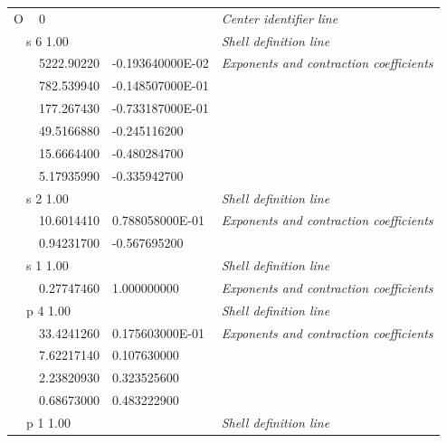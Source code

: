 \documentclass[a4paper,12pt]{article}
\begin{document}
\begin{tabular}{lllll}
\multicolumn{2}{l}{O} & \multicolumn{2}{l}{0} & {\em Center identifier line} \\
 & \multicolumn{3}{l}{s \hspace{0.5 cm}  6  \hspace{0.5 cm} 1.00}  & {\em Shell definition line} \\
 &   & 5222.90220 &  -0.193640000E-02  & {\em Exponents and contraction coefficients} \\
 &   & 782.539940 &  -0.148507000E-01  &          \\
 &   & 177.267430 &  -0.733187000E-01  &          \\ 
 &   & 49.5166880 &  -0.245116200      &          \\  
 &   & 15.6664400 &  -0.480284700      &          \\  
 &   & 5.17935990 &  -0.335942700      &          \\
 & \multicolumn{3}{l}{s \hspace{0.5 cm}  2  \hspace{0.5 cm} 1.00}  & {\em Shell definition line} \\
 &   & 10.6014410 &  0.788058000E-01   &  {\em Exponents and contraction coefficients} \\
 &   & 0.94231700 &  -0.567695200      &          \\
 & \multicolumn{3}{l}{s \hspace{0.5 cm}  1  \hspace{0.5 cm} 1.00}  & {\em Shell definition line} \\
 &   & 0.27747460 &   1.000000000      &  {\em Exponents and contraction coefficients} \\
 & \multicolumn{3}{l}{p \hspace{0.5 cm}  4  \hspace{0.5 cm} 1.00}  & {\em Shell definition line} \\
 &   & 33.4241260 &  0.175603000E-01   &  {\em Exponents and contraction coefficients} \\
 &   & 7.62217140 &  0.107630000       &          \\
 &   & 2.23820930 &  0.323525600       &          \\
 &   & 0.68673000 &  0.483222900       &          \\
 & \multicolumn{3}{l}{p \hspace{0.5 cm}  1  \hspace{0.5 cm} 1.00}  & {\em Shell definition line} \\

\end{tabular}
\end{document}
